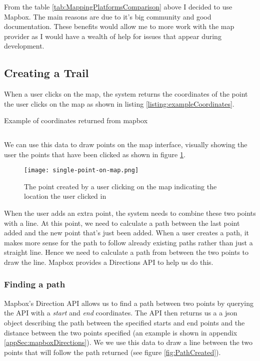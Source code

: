 From the table \ref{tab:MappingPlatformsComparison} above I decided to use Mapbox. The main reasons are due to it's big community and good documentation. These benefits would allow me to more work with the map provider as I would have a wealth of help for issues that appear during development.

\subsection{Creating a Trail}
When a user clicks on the map, the system returns the coordinates of the point the user clicks on the map as shown in listing \ref{listing:exampleCoordinates}.

\begin{listing}[ht]
\caption{Example of coordinates returned from mapbox}
\inputminted[frame=lines,framesep=2mm,baselinestretch=1.2,fontsize=\footnotesize]{json}{listings/example-coordinates.json}
\label{listing:exampleCoordinates}
\end{listing}

We can use this data to draw points on the map interface, visually showing the user the points that have been clicked as shown in figure \ref{fig:SinglePointCreated}. 
\begin{figure}[ht]
    \centering
    \texttt{[image: single-point-on-map.png]}
    \caption{The point created by a user clicking on the map indicating the location the user clicked in}
    \label{fig:SinglePointCreated}
\end{figure}
When the user adds an extra point, the system needs to combine these two points with a line. At this point, we need to calculate a path between the last point added and the new point that's just been added. When a user creates a path, it makes more sense for the path to follow already existing paths rather than just a straight line. Hence we need to calculate a path from between the two points to draw the line. Mapbox provides a Directions API to help us do this.


\subsubsection{Finding a path}
Mapbox's Direction API allows us to find a path between two points by querying the API with a \textit{start} and \textit{end} coordinates.  The API then returns us a a json object describing the path between the specified starts and end points and the distance between the two points specified (an example is shown in appendix \ref{appSec:mapboxDirections}). We we use this data to draw a line between the two points that will follow the path returned (see figure \ref{fig:PathCreated}).


